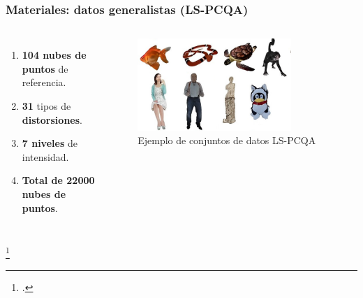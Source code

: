 \begin{frame}
  \frametitle{Materiales: datos generalistas (LS-PCQA)}
  \begin{columns}
    \begin{enumerate}
      \item \textbf{104 nubes de puntos} de referencia.  
      \item \textbf{31} tipos de \textbf{distorsiones}.
      \item \textbf{7 niveles} de intensidad.
      \item \textbf{Total de 22000 nubes de puntos}.
    \end{enumerate}
    \begin{figure}
      \includegraphics[width=0.8\textwidth]{imagenes/chapter3/LSPCQA}
      \caption{Ejemplo de conjuntos de datos LS-PCQA\footnotemark}
      \label{fig:LSSJTU}
    \end{figure}
  \end{columns}
  \footcitetext{ResSCNN}
\end{frame}


